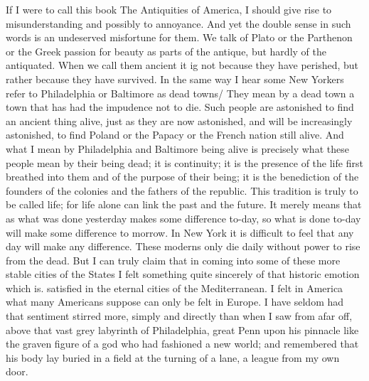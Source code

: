 \documentclass{book}
\begin{document}
If I were to call this book The Antiquities of America, I should give rise to misunderstanding and possibly to annoyance. And yet the double sense in such words is an undeserved misfortune for them. We talk of Plato or the Parthenon or the Greek passion for beauty as parts of the antique, but hardly of the antiquated. When we call them ancient it ig not because they have perished, but rather because they have survived. In the same way I hear some New Yorkers refer to Philadelphia or Baltimore as dead towns/ They mean by a dead town a town that has had the impudence not to die. Such people are astonished to find an ancient thing alive, just as they are now astonished, and will be increasingly astonished, to find Poland or the Papacy or the French nation still alive. And what I mean by Philadelphia and Baltimore being alive is precisely what these people mean by their being dead; it is continuity; it is the presence of the life first breathed into them and of the purpose of their being; it is the benediction of the founders of the colonies and the fathers of the republic. This tradition is truly to be called life; for life alone can link the past and the future. It merely means that as what was done yesterday makes some difference to-day, so what is done to-day will make some difference to morrow. In New York it is difficult to feel that any day will make any difference. These moderns only die daily without power to rise from the dead. But I can truly claim that in coming into some of these more stable cities of the States I felt something quite sincerely of that historic emotion which is. satisfied in the eternal cities of the Mediterranean. I felt in America what many Americans suppose can only be felt in Europe. I have seldom had that sentiment stirred more, simply and directly than when I saw from afar off, above that vast grey labyrinth of Philadelphia, great Penn upon his pinnacle like the graven figure of a god who had fashioned a new world; and remembered that his body lay buried in a field at the turning of a lane, a league from my own door.
\end{document}
